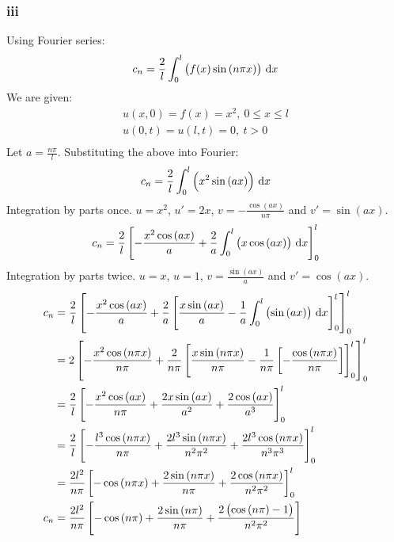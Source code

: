 \documentclass[11pt]{article}
\numberwithin{equation}{section}
\begin{document}
\subsubsection*{iii}
Using Fourier series:
\begin{align}
	c_n = \frac{2}{l}\int_{0}^{l} \left(f(x)\sin\left(n\pi x\right)\right) \,\dif x 
\end{align}
We are given:
\begin{align}
	u(x,0) = f(x) = x^2, \ 0 \leq x \leq l\\
	u(0,t) = u(l,t) = 0, \ t > 0\\
\end{align}
Let $a = \frac{n\pi}{l}$. Substituting the above into Fourier:
\begin{align}
	c_n = \frac{2}{l} \int_{0}^{l} \left( x^2 \sin\left(a x\right) \right) \,\dif x \\
\end{align}
Integration by parts once. $u = x^2$, $u' = 2x$, $v = -\frac{\cos\left(a x\right)}{n\pi}$ and $v' = \sin\left(a x\right)$.
\begin{align}
	c_n = \frac{2}{l}\left[ -\frac{x^2 \cos\left(a x\right)}{a} + \frac{2}{a}\int_{0}^{l} \left(x\cos\left(a x\right)\right) \,\dif x \right]_0^l
\end{align} 
Integration by parts twice. $u = x$, $u = 1$, $v= \frac{\sin\left(a x\right)}{a}$ and $v' = \cos\left(a x\right)$.
\begin{align}
	c_n &= \frac{2}{l}\left[ -\frac{x^2 \cos\left(a x\right)}{a} + \frac{2}{a}\left[ \frac{x\sin\left(a x\right)}{a} - \frac{1}{a} \int_{0}^{l} \left(\sin\left(a x\right)\right) \,\dif x \right]_0^l \right]_0^l\\
	&= 2\left[ -\frac{x^2 \cos\left(n\pi x\right)}{n\pi} + \frac{2}{n\pi}\left[ \frac{x\sin\left(n\pi x\right)}{n\pi} - \frac{1}{n\pi} \left[ -\frac{\cos\left(n\pi x\right)}{n\pi} \right] \right]_0^l \right]_0^l\\
	&= \frac{2}{l}\left[ -\frac{x^2 \cos\left(a x\right)}{n\pi} + \frac{2x\sin\left(a x\right)}{a^2} + \frac{2\cos\left(a x\right)}{a^3} \right]_0^l\\
	&= \frac{2}{l}\left[ -\frac{l^3 \cos\left(n\pi x\right)}{n\pi} + \frac{2l^3\sin\left(n\pi x\right)}{n^2\pi^2} + \frac{2l^3\cos\left(n\pi x\right)}{n^3\pi^3} \right]_0^l\\
	&= \frac{2l^2}{n\pi}\left[ -\cos\left(n\pi x\right) + \frac{2\sin\left(n\pi x\right)}{n\pi} + \frac{2\cos\left(n\pi x\right)}{n^2\pi^2} \right]_0^l\\
	c_n &= \frac{2l^2}{n\pi}\left[ -\cos\left(n\pi\right) + \frac{2\sin\left(n\pi\right)}{n\pi} +\frac{2\left(\cos\left(n\pi\right)-1\right)}{n^2\pi^2} \right]
\end{align}
\end{document}

